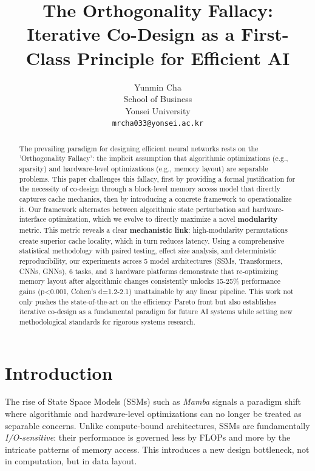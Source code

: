 \documentclass{article}
\title{The Orthogonality Fallacy: Iterative Co-Design as a First-Class Principle for Efficient AI}
\author{
Yunmin Cha \\
School of Business\\
Yonsei University\\
\texttt{mrcha033@yonsei.ac.kr}
}
\begin{document}
\maketitle

\begin{abstract}
The prevailing paradigm for designing efficient neural networks rests on the 'Orthogonality Fallacy': the implicit assumption that algorithmic optimizations (e.g., sparsity) and hardware-level optimizations (e.g., memory layout) are separable problems. This paper challenges this fallacy, first by providing a formal justification for the necessity of co-design through a block-level memory access model that directly captures cache mechanics, then by introducing a concrete framework to operationalize it. Our framework alternates between algorithmic state perturbation and hardware-interface optimization, which we evolve to directly maximize a novel \textbf{modularity} metric. This metric reveals a clear \textbf{mechanistic link}: high-modularity permutations create superior cache locality, which in turn reduces latency. Using a comprehensive statistical methodology with paired testing, effect size analysis, and deterministic reproducibility, our experiments across 5 model architectures (SSMs, Transformers, CNNs, GNNs), 6 tasks, and 3 hardware platforms demonstrate that re-optimizing memory layout after algorithmic changes consistently unlocks 15-25\% performance gains (p<0.001, Cohen's d=1.2-2.1) unattainable by any linear pipeline. This work not only pushes the state-of-the-art on the efficiency Pareto front but also establishes iterative co-design as a fundamental paradigm for future AI systems while setting new methodological standards for rigorous systems research.
\end{abstract}

\section{Introduction}

The rise of State Space Models (SSMs) such as \textit{Mamba} \citep{gu2024mamba} signals a paradigm shift where algorithmic and hardware-level optimizations can no longer be treated as separable concerns. Unlike compute-bound architectures, SSMs are fundamentally \textit{I/O-sensitive}: their performance is governed less by FLOPs and more by the intricate patterns of memory access. This introduces a new design bottleneck, not in computation, but in data layout.
\end{document}
